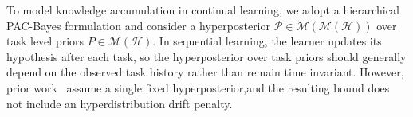 \documentclass{article}
\theoremstyle{plain}
\theoremstyle{definition}
\theoremstyle{remark}
\begin{document}
To model knowledge accumulation in continual learning, we adopt a hierarchical PAC-Bayes formulation and consider a hyperposterior $\mathcal{P} \in \mathcal{M}(\mathcal{M}(\mathcal{H}))$ over task level priors $P \in \mathcal{M}(\mathcal{H})$.
In sequential learning, the learner updates its hypothesis after each task, so the hyperposterior over task priors should generally depend on the observed task history rather than remain time invariant. 
However, prior work~\citep{pentinaPACBayesianBoundLifelong2014,JMLR:v24:22-1254} assume a single fixed hyperposterior,and the resulting bound does not include an hyperdistribution drift penalty.
\end{document}
